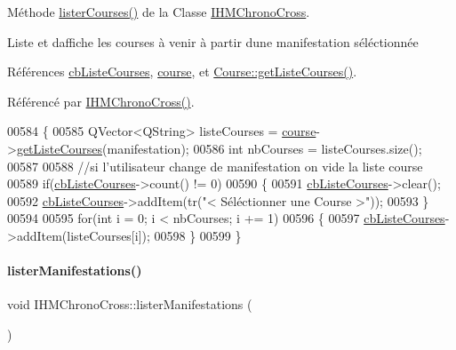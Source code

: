 Méthode \hyperlink{class_i_h_m_chrono_cross_a1b9f117d7097b63ddabe168a5349a7e8}{lister\+Courses()} de la Classe \hyperlink{class_i_h_m_chrono_cross}{I\+H\+M\+Chrono\+Cross}. 

Liste et d\textquotesingle{}affiche les courses à venir à partir d\textquotesingle{}une manifestation séléctionnée 

Références \hyperlink{class_i_h_m_chrono_cross_af47891e3e9f2bb2c955be8c128e830b5}{cb\+Liste\+Courses}, \hyperlink{class_i_h_m_chrono_cross_a03a8226c0e7f423d29302d9a06284ab4}{course}, et \hyperlink{class_course_ae5e74946d973166ad3000e38600acf20}{Course\+::get\+Liste\+Courses()}.



Référencé par \hyperlink{class_i_h_m_chrono_cross_a479fc90733fba3e65fb06aa4a3adc02e}{I\+H\+M\+Chrono\+Cross()}.


\begin{DoxyCode}
00584 \{
00585     QVector<QString> listeCourses = \hyperlink{class_i_h_m_chrono_cross_a03a8226c0e7f423d29302d9a06284ab4}{course}->\hyperlink{class_course_ae5e74946d973166ad3000e38600acf20}{getListeCourses}(manifestation);
00586     \textcolor{keywordtype}{int} nbCourses = listeCourses.size();
00587 
00588     \textcolor{comment}{//si l'utilisateur change de manifestation on vide la liste course}
00589     \textcolor{keywordflow}{if}(\hyperlink{class_i_h_m_chrono_cross_af47891e3e9f2bb2c955be8c128e830b5}{cbListeCourses}->count() != 0)
00590     \{
00591         \hyperlink{class_i_h_m_chrono_cross_af47891e3e9f2bb2c955be8c128e830b5}{cbListeCourses}->clear();
00592         \hyperlink{class_i_h_m_chrono_cross_af47891e3e9f2bb2c955be8c128e830b5}{cbListeCourses}->addItem(tr(\textcolor{stringliteral}{"< Séléctionner une Course >"}));
00593     \}
00594 
00595     \textcolor{keywordflow}{for}(\textcolor{keywordtype}{int} i = 0; i < nbCourses; i += 1)
00596     \{
00597         \hyperlink{class_i_h_m_chrono_cross_af47891e3e9f2bb2c955be8c128e830b5}{cbListeCourses}->addItem(listeCourses[i]);
00598     \}
00599 \}
\end{DoxyCode}
\mbox{\label{class_i_h_m_chrono_cross_adb47e6ee9c2a917a6df77b64930c3c48}} 
\paragraph{\texorpdfstring{lister\+Manifestations()}{listerManifestations()}}
{\footnotesize\ttfamily void I\+H\+M\+Chrono\+Cross\+::lister\+Manifestations (\begin{DoxyParamCaption}{ }\end{DoxyParamCaption})\hspace{0.3cm}{\ttfamily [private]}}



